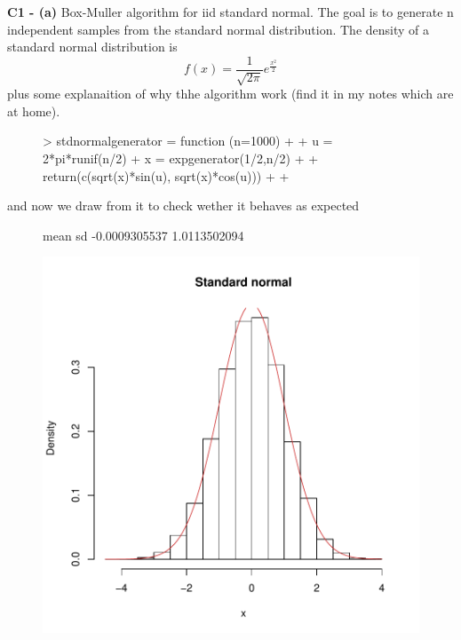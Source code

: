 \documentclass[12pt]{article}
\begin{document}
{{{{{\sffamily \textbf{C1 - (a)} Box-Muller algorithm for iid standard normal.}
The goal is to generate n independent samples from the standard normal distribution. The density of a standard normal distribution is
\begin{equation}
f(x)= \frac{1}{\sqrt{2\pi}} e^{\frac{x^2}{2}}
\end{equation}
plus some explanaition of why thhe algorithm work (find it in my notes which are at home).

\begin{figure}[H]
\centering
\begin{Schunk}
\begin{Sinput}
> stdnormalgenerator = function (n=1000){
+ 
+   u = 2*pi*runif(n/2)
+   x = expgenerator(1/2,n/2)
+   
+   return(c(sqrt(x)*sin(u), sqrt(x)*cos(u)))
+ 
+ } 
\end{Sinput}
\end{Schunk}
\end{figure}
and now we draw from it to check wether it behaves as expected
\begin{figure}[H]
\centering
\begin{Schunk}
\begin{Soutput}
         mean            sd 
-0.0009305537  1.0113502094 
\end{Soutput}
\end{Schunk}
\includegraphics{p1partC01v02-008}

\end{figure}}}}}
\end{document}

